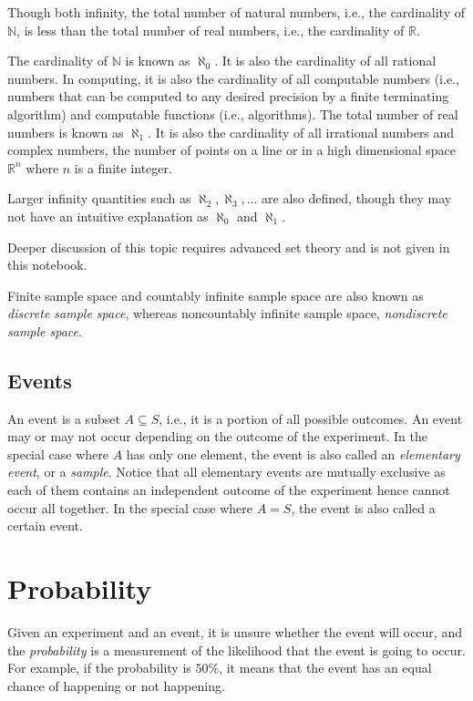 \begin{shortbox}
Though both infinity, the total number of natural numbers, i.e., the cardinality of $\mathbb{N}$, is less than the total number of real numbers, i.e., the cardinality of $\mathbb{R}$.

The cardinality of $\mathbb{N}$ is known as $\aleph_0$. It is also the cardinality of all rational numbers. In computing, it is also the cardinality of all computable numbers (i.e., numbers that can be computed to any desired precision by a finite terminating algorithm) and computable functions (i.e., algorithms). The total number of real numbers is known as $\aleph_1$. It is also the cardinality of all irrational numbers and complex numbers, the number of points on a line or in a high dimensional space $\mathbb{R}^n$ where $n$ is a finite integer.

Larger infinity quantities such as $\aleph_2, \aleph_3, \ldots$ are also defined, though they may not have an intuitive explanation as $\aleph_0$ and $\aleph_1$.

Deeper discussion of this topic requires advanced set theory and is not given in this notebook.
\end{shortbox}

Finite sample space and countably infinite sample space are also known as \textit{discrete sample space}, whereas noncountably infinite sample space, \textit{nondiscrete sample space}.

\subsection{Events}

An event is a subset $A \subseteq S$, i.e., it is a portion of all possible outcomes. An event may or may not occur depending on the outcome of the experiment. In the special case where $A$ has only one element, the event is also called an \textit{elementary event}, or a \textit{sample}. Notice that all elementary events are mutually exclusive as each of them contains an independent outcome of the experiment hence cannot occur all together. In the special case where $A=S$, the event is also called a certain event.

\section{Probability}

Given an experiment and an event, it is unsure whether the event will occur, and the \textit{probability} is a measurement of the likelihood that the event is going to occur. For example, if the probability is $50\%$, it means that the event has an equal chance of happening or not happening.

